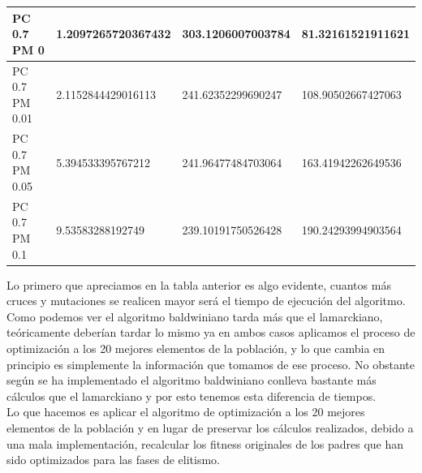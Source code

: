 \documentclass[10pt,a4paper]{article}
\begin{document}
\begin{center}
\begin{table}[H]
\begin{tabular}{|l|l|l|l|}
PC 0.7 PM 0                         & 1.2097265720367432                                             & 303.1206007003784                                                 & 81.32161521911621                                                 \\ \hline
PC 0.7 PM 0.01                      & 2.1152844429016113                                             & 241.62352299690247                                                & 108.90502667427063                                                \\ \hline
PC 0.7 PM 0.05                      & 5.394533395767212                                              & 241.96477484703064                                                & 163.41942262649536                                                \\ \hline
PC 0.7 PM 0.1                       & 9.53583288192749                                               & 239.10191750526428                                                & 190.24293994903564                                                \\ \hline
\end{tabular}
\end{table}
\end{center}

Lo primero que apreciamos en la tabla anterior es algo evidente, cuantos más cruces y mutaciones se realicen mayor será el tiempo de ejecución del algoritmo. Como podemos ver el algoritmo baldwiniano tarda más que el lamarckiano, teóricamente deberían tardar lo mismo ya en ambos casos aplicamos el proceso de optimización a los 20 mejores elementos de la población, y lo que cambia en principio es simplemente la información que tomamos de ese proceso. No obstante según se ha implementado el algoritmo baldwiniano conlleva bastante más cálculos que el lamarckiano y por esto tenemos esta diferencia de tiempos.\\

Lo que hacemos es aplicar el algoritmo de optimización a los 20 mejores elementos de la población y en lugar de preservar los cálculos realizados, debido a una mala implementación, recalcular los fitness originales de los padres que han sido optimizados para las fases de elitismo.\\
\end{document}
